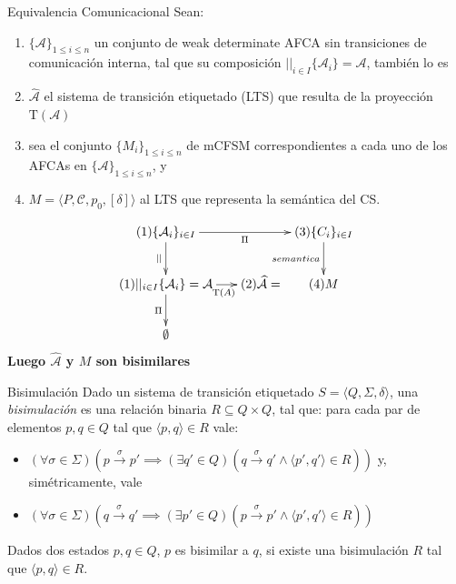 \documentclass[10pt,xcolor={table,dvipsnames},t]{beamer}
\newcommand{\Tau}{\mathrm{T}}
\begin{document}
\begin{frame}{Equivalencia Comunicacional}
Sean:
\begin{enumerate}
\item $\{\mathcal{A}\}_{1 \leq i \leq n}$ un conjunto de weak determinate AFCA sin transiciones de comunicación interna, tal que su composición $||_{i \in I}\{\mathcal{A}_i\}= \mathcal{A}$, también lo es
\item $\widehat{\mathcal{A}}$ el sistema de transición etiquetado (LTS) que resulta de la proyección $\Tau(\mathcal{A})$
\item sea el conjunto $\{M_i\}_{1 \leq i \leq n}$ de mCFSM correspondientes a cada uno de los AFCAs en $\{\mathcal{A}\}_{1 \leq i \leq n}$, y
\item $M = \langle P, \mathcal{C}, {p_0}, [\delta] \rangle$ al LTS que representa la semántica del CS.
\end{enumerate}
$$
\xymatrix@C=0.5em{
	(1)\{\mathcal{A}_i\}_{i \in I} \ar[rrr]_{\Pi} \ar[d]_{||} & & & (3)\{C_i\}_{i \in I}  \ar[d]_{semantica}  \\
	  {(1)||_{i \in I}\{\mathcal{A}_i\}= \mathcal{A}} \ar[rr]_{\ \ \ \ \ \Tau(A)} \ar[d]_{\Pi} & &  (2)\widehat{\mathcal{A}} =& (4) M  \\
	  \emptyset
}
$$
\textbf{Luego $\widehat{\mathcal{A}}$ y $M$ son bisimilares}

\end{frame}

\begin{frame}{Bisimulación \cite{milner89}}
\vspace{\fill}
Dado un sistema de transición etiquetado $ S = \langle Q, \Sigma, \delta \rangle $, una \emph{bisimulación} es una relación binaria $R \subseteq Q \times Q$, tal que: para cada par de elementos $p, q \in Q$ tal que $\langle p, q \rangle \in R$ vale:
\begin{itemize}
    \item $(\forall \sigma \in \Sigma)(p \xrightarrow{\sigma} p' \implies (\exists q' \in Q)(q \xrightarrow{\sigma} q' \land \langle p', q' \rangle \in R))$ y, simétricamente, vale 
    \item $(\forall \sigma \in \Sigma)(q \xrightarrow{\sigma} q' \implies (\exists p' \in Q)(p \xrightarrow{\sigma} p' \land \langle p', q' \rangle \in R))$
\end{itemize}
Dados dos estados $p, q \in Q $, $p$ es bisimilar a $q$, si existe una bisimulación $R$ tal que $\langle p, q \rangle \in R$.
\vspace{\fill}
\end{frame}
\end{document}
